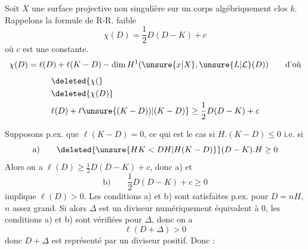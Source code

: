 
Soit $X$ une surface projective non singulière sur un corps algébriquement clos $k$.  Rappelons la formule de R-R. faible
\[
\chi(D)=\frac12D(D-K)+c
\]
où $c$ est une constante.  
\[
\chi(D)=\ell(D)+\ell(K-D)-\dim H^1(\unsure{x|X},\unsure{L|\mathcal{L}}(D))\qquad\text{d'où}
\]
\[
\begin{aligned}
&\deleted{\chi(}\\
&\deleted{\chi(D)}\\
&\ell(D)+\ell\unsure{(K-D))|(K-D)}\geq\frac12D(D-K)+c
\end{aligned}
\]


Supposons p.ex. que $\ell(K-D)=0$, ce qui est le cas si $H.(K-D)\leq0$ i.e. si
\[
\text{a)}\qquad \deleted{\unsure{HK<DH|H(K-D)}} (D-K).H\geq0
\]
Alors on a $\ell(D)\geq\frac12D(D-K)+c$, donc a) et 
\[
\text{b)}\qquad \frac12D(D-K)+c\geq0
\]
implique $\ell(D)>0$. Les conditions a) et b) sont satisfaites p.ex. pour  $D=nH$, $n$ assez grand. Si alors $\Delta$  est un diviseur numériquement équivalent à $0$, les conditions a) et b) sont vérifiées pour $\Delta$, donc on a
\[
\ell(D+\Delta)>0
\]
donc $D+\Delta$ est représenté par un diviseur positif. Donc :

